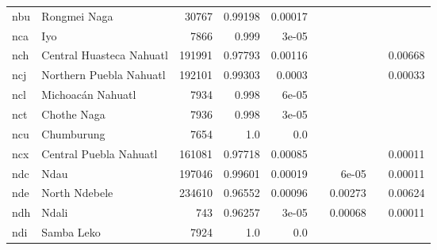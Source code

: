 \documentclass[11pt]{article}
\begin{document}
\begin{table*}[h]
{\begin{tabular}{llrrrrrrr}
nbu         & Rongmei Naga         & 30767         & 0.99198         & 0.00017         &          &          &          &          \\

nca         & Iyo         & 7866         & 0.999         & 3e-05         &          &          &          &          \\

nch         & Central Huasteca Nahuatl         & 191991         & 0.97793         & 0.00116         &          &          &          & 0.00668         \\

ncj         & Northern Puebla Nahuatl         & 192101         & 0.99303         & 0.0003         &          &          &          & 0.00033         \\

ncl         & Michoacán Nahuatl         & 7934         & 0.998         & 6e-05         &          &          &          &          \\

nct         & Chothe Naga         & 7936         & 0.998         & 3e-05         &          &          &          &          \\

ncu         & Chumburung         & 7654         & 1.0         & 0.0         &          &          &          &          \\

ncx         & Central Puebla Nahuatl         & 161081         & 0.97718         & 0.00085         &          &          &          & 0.00011         \\

ndc         & Ndau         & 197046         & 0.99601         & 0.00019         &          & 6e-05         &          & 0.00011         \\

nde         & North Ndebele         & 234610         & 0.96552         & 0.00096         &          & 0.00273         &          & 0.00624         \\

ndh         & Ndali         & 743         & 0.96257         & 3e-05         &          & 0.00068         &          & 0.00011         \\

ndi         & Samba Leko         & 7924         & 1.0         & 0.0         &          &          &          &          \\


\end{tabular}}
\end{table*}
\end{document}
